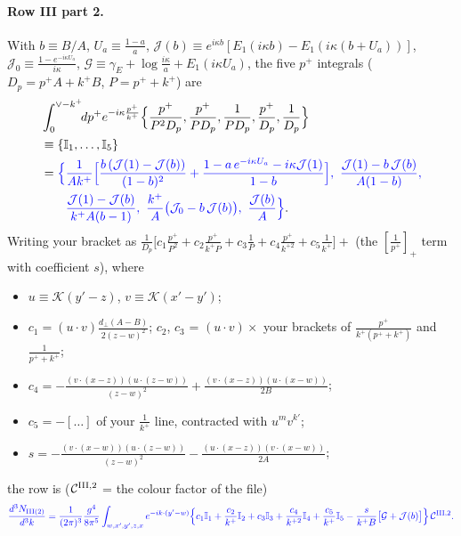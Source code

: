 \documentclass[10pt]{article}
\numberwithin{equation}{section}
\newcommand{\new}[1]{{\color{blue}#1}}
\newcommand{\KK}{\mathcal K}
\newcommand{\pre}{\frac{1}{(2\pi)^3}}
\begin{document}
\paragraph{Row III part 2.} With $b\equiv B/A$, $U_a\equiv\frac{1-a}{a}$, $\mathcal J(b)\equiv e^{i\kappa b}[E_1(i\kappa b)-E_1(i\kappa(b+U_a))]$, $\mathcal J_0\equiv\frac{1-e^{-i\kappa U_a}}{i\kappa}$, $\mathcal G\equiv\gamma_E+\log\frac{i\kappa}{a}+E_1(i\kappa U_a)$, the five $p^+$ integrals ($D_p=p^+A+k^+B$, $P=p^++k^+$) are
\begin{align*}
&\int_0^{\vee-k^+}\!\!dp^+e^{-i\kappa\frac{p^+}{k^+}}\Big\{\frac{p^+}{P^2D_p},\frac{p^+}{PD_p},\frac{1}{PD_p},\frac{p^+}{D_p},\frac{1}{D_p}\Big\}\\
&\equiv\{\mathbb I_1,\dots,\mathbb I_5\}\\
&=\new{\Big\{\frac{1}{Ak^+}\Big[\frac{b\,(\mathcal J(1)-\mathcal J(b))}{(1-b)^2}+\frac{1-a\,e^{-i\kappa U_a}-i\kappa\mathcal J(1)}{1-b}\Big],\ \frac{\mathcal J(1)-b\,\mathcal J(b)}{A(1-b)},}\\
&\qquad\new{\frac{\mathcal J(1)-\mathcal J(b)}{k^+A(b-1)},\ \frac{k^+}{A}\big(\mathcal J_0-b\,\mathcal J(b)\big),\ \frac{\mathcal J(b)}{A}\Big\}}.
\end{align*}
Writing your bracket as $\frac{1}{D_p}\big[c_1\frac{p^+}{P^2}+c_2\frac{p^+}{k^+P}+c_3\frac1P+c_4\frac{p^+}{k^{+2}}+c_5\frac{1}{k^+}\big]+$ (the $[\frac{1}{p^+}]_+$ term with coefficient $s$), where
\begin{itemize}
\item $u\equiv\KK(y'-z)$, $v\equiv\KK(x'-y')$;
\item $c_1=(u\!\cdot\!v)\frac{d_\perp(A-B)}{2(z-w)^2}$; $c_2$, $c_3$ = $(u\!\cdot\!v)\times$ your brackets of $\frac{p^+}{k^+(p^++k^+)}$ and $\frac{1}{p^++k^+}$;
\item $c_4=-\frac{(v\cdot(x-z))(u\cdot(z-w))}{(z-w)^2}+\frac{(v\cdot(x-z))(u\cdot(x-w))}{2B}$;
\item $c_5=-[\dots]$ of your $\frac1{k^+}$ line, contracted with $u^m v^{k'}$;
\item $s=-\frac{(v\cdot(x-w))(u\cdot(z-w))}{(z-w)^2}-\frac{(u\cdot(x-z))(v\cdot(x-w))}{2A}$;
\end{itemize}
the row is ($\mathcal C^{\rm III,2}$ = the colour factor of the file)
\begin{equation}
\new{\frac{d^3N_{\rm III(2)}}{d^3k}=\pre\frac{g^4}{8\pi^5}\int_{w,x',y',z,x}e^{-ik\cdot(y'-w)}\Big\{c_1\mathbb I_1+\frac{c_2}{k^+}\mathbb I_2+c_3\mathbb I_3+\frac{c_4}{k^{+2}}\mathbb I_4+\frac{c_5}{k^+}\mathbb I_5-\frac{s}{k^+B}\big[\mathcal G+\mathcal J(b)\big]\Big\}\,\mathcal C^{\rm III,2}.}
\label{eq:III2}
\end{equation}
\end{document}
